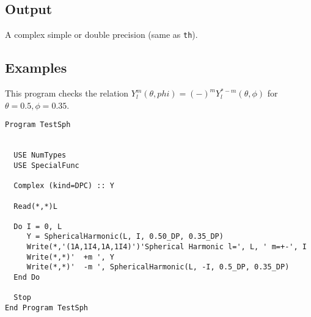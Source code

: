 \subsection{Output}

A complex simple or double precision (same as \texttt{th}).

\subsection{Examples}

This program checks the relation $Y_l^m(\theta,phi) =
(-)^mY_l^{*-m}(\theta,\phi)$ for $\theta=0.5, \phi=0.35$.

\begin{lstlisting}[emph=SphericalHarmonic,
                   emphstyle=\color{blue},
                   frame=trBL,
                   caption=Computing some spherical harmonics.,
                   label=sph]
Program TestSph


  USE NumTypes
  USE SpecialFunc

  Complex (kind=DPC) :: Y

  Read(*,*)L

  Do I = 0, L
     Y = SphericalHarmonic(L, I, 0.50_DP, 0.35_DP)
     Write(*,'(1A,1I4,1A,1I4)')'Spherical Harmonic l=', L, ' m=+-', I
     Write(*,*)'  +m ', Y
     Write(*,*)'  -m ', SphericalHarmonic(L, -I, 0.5_DP, 0.35_DP)
  End Do

  Stop
End Program TestSph
\end{lstlisting}



